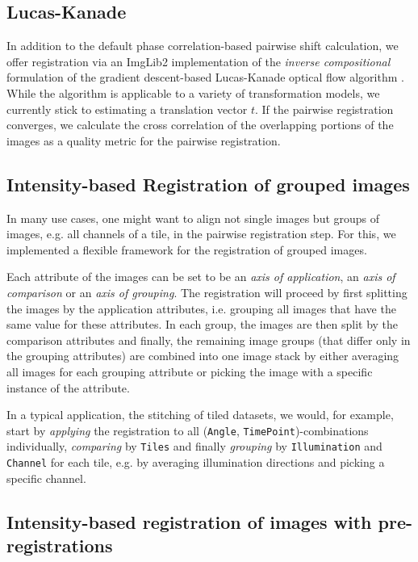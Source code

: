 \subsection*{Lucas-Kanade}

In addition to the default phase correlation-based pairwise shift calculation, we offer registration via an ImgLib2 implementation of the \emph{inverse compositional} formulation of the gradient descent-based Lucas-Kanade optical flow algorithm \cite{baker2004lucas}. While the algorithm is applicable to a variety of transformation models, we currently stick to estimating a translation vector $t$. If the pairwise registration converges, we calculate the cross correlation of the overlapping portions of the images as a quality metric for the pairwise registration. 

\subsection*{Intensity-based Registration of grouped images}

In many use cases, one might want to align not single images but groups of images, e.g. all channels of a tile, in the pairwise registration step. For this, we implemented a flexible framework for the registration of grouped images.

Each attribute of the images can be set to be an \emph{axis of application}, an \emph{axis of comparison} or an \emph{axis of grouping}. The registration will proceed by first splitting the images by the application attributes, i.e. grouping all images that have the same value for these attributes. In each group, the images are then split by the comparison attributes and finally, the remaining image groups (that differ only in the grouping attributes) are combined into one image stack by either averaging all images for each grouping attribute or picking the image with a specific instance of the attribute.   

In a typical application, the stitching of tiled datasets, we would, for example, start by \emph{applying} the registration to all (\texttt{Angle}, \texttt{TimePoint})-combinations individually, \emph{comparing} by \texttt{Tiles} and finally \emph{grouping} by \texttt{Illumination} and \texttt{Channel} for each tile, e.g. by averaging illumination directions and picking a specific channel.

\subsection*{Intensity-based registration of images with pre-registrations}

